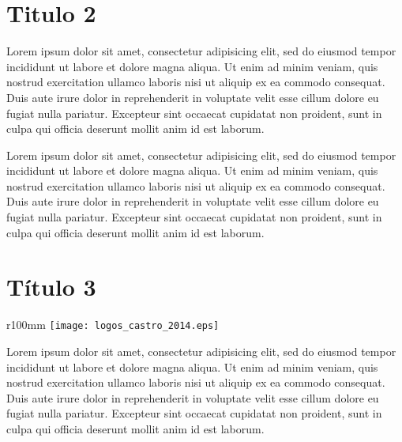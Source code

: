 \documentclass[a4paper,10pt,twoside]{article}
\begin{document}
\section{Titulo 2}
Lorem ipsum dolor sit amet, consectetur adipisicing elit, sed do eiusmod tempor incididunt ut labore 
et dolore magna aliqua. Ut enim ad minim veniam, quis nostrud exercitation ullamco laboris nisi ut 
aliquip ex ea commodo consequat. Duis aute irure dolor in reprehenderit in voluptate velit esse cillum 
dolore eu fugiat nulla pariatur. Excepteur sint occaecat cupidatat non proident, sunt in culpa qui 
officia deserunt mollit anim id est laborum.

\def\svgwidth{15.05cm}
\vspace*{-4mm}\hspace*{-7mm}

Lorem ipsum dolor sit amet, consectetur adipisicing elit, sed do eiusmod tempor incididunt ut labore 
et dolore magna aliqua. Ut enim ad minim veniam, quis nostrud exercitation ullamco laboris nisi ut 
aliquip ex ea commodo consequat. Duis aute irure dolor in reprehenderit in voluptate velit esse cillum 
dolore eu fugiat nulla pariatur. Excepteur sint occaecat cupidatat non proident, sunt in culpa qui 
officia deserunt mollit anim id est laborum.

\section{Título 3}
\begin{wrapfigure}{r}{100mm}
\vspace{-4mm}%
    \texttt{[image: logos\_castro\_2014.eps]}
\vspace*{-6mm}\label{figura1}
\vspace*{-3mm}
\end{wrapfigure}
Lorem ipsum dolor sit amet, consectetur adipisicing elit, sed do eiusmod tempor incididunt ut labore 
et dolore magna aliqua. Ut enim ad minim veniam, quis nostrud exercitation ullamco laboris nisi ut 
aliquip ex ea commodo consequat. Duis aute irure dolor in reprehenderit in voluptate velit esse cillum 
dolore eu fugiat nulla pariatur. Excepteur sint occaecat cupidatat non proident, sunt in culpa qui 
officia deserunt mollit anim id est laborum.
\end{document}
